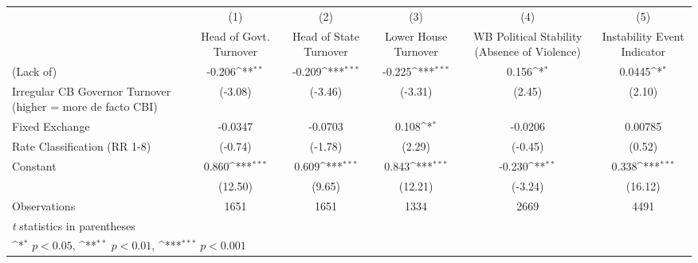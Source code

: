 {
\def\sym#1{\ifmmode^{#1}\else\(^{#1}\)\fi}
\begin{tabular}{l*{5}{c}}
\toprule
                &\multicolumn{1}{c}{(1)}&\multicolumn{1}{c}{(2)}&\multicolumn{1}{c}{(3)}&\multicolumn{1}{c}{(4)}&\multicolumn{1}{c}{(5)}\\
                &\multicolumn{1}{c}{Head of Govt. Turnover}&\multicolumn{1}{c}{Head of State Turnover}&\multicolumn{1}{c}{Lower House Turnover}&\multicolumn{1}{c}{WB Political Stability (Absence of Violence)}&\multicolumn{1}{c}{Instability Event Indicator}\\
\midrule
(Lack of)       &   -0.206\sym{**} &   -0.209\sym{***}&   -0.225\sym{***}&    0.156\sym{*}  &   0.0445\sym{*}  \\
Irregular CB Governor Turnover (higher = more de facto CBI)&  (-3.08)         &  (-3.46)         &  (-3.31)         &   (2.45)         &   (2.10)         \\
\addlinespace
Fixed Exchange  &  -0.0347         &  -0.0703         &    0.108\sym{*}  &  -0.0206         &  0.00785         \\
Rate Classification (RR 1-8)&  (-0.74)         &  (-1.78)         &   (2.29)         &  (-0.45)         &   (0.52)         \\
\addlinespace
Constant        &    0.860\sym{***}&    0.609\sym{***}&    0.843\sym{***}&   -0.230\sym{**} &    0.338\sym{***}\\
                &  (12.50)         &   (9.65)         &  (12.21)         &  (-3.24)         &  (16.12)         \\
\midrule
Observations    &     1651         &     1651         &     1334         &     2669         &     4491         \\
\bottomrule
\multicolumn{6}{l}{\footnotesize \textit{t} statistics in parentheses}\\
\multicolumn{6}{l}{\footnotesize \sym{*} \(p<0.05\), \sym{**} \(p<0.01\), \sym{***} \(p<0.001\)}\\
\end{tabular}
}
